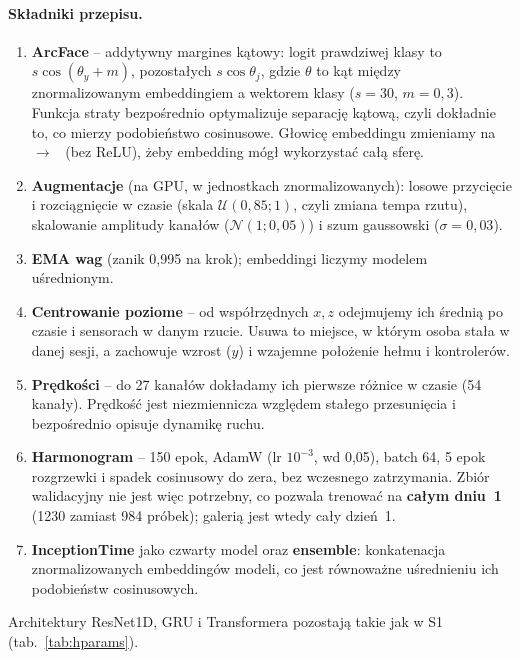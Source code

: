 \paragraph{Składniki przepisu.}
\begin{enumerate}
  \item \textbf{ArcFace} \cite{arcface} -- addytywny margines kątowy: logit prawdziwej klasy to
        $s\cos(\theta_y + m)$, pozostałych $s\cos\theta_j$, gdzie $\theta$ to kąt między
        znormalizowanym embeddingiem a wektorem klasy ($s = 30$, $m = 0{,}3$). Funkcja straty
        bezpośrednio optymalizuje separację kątową, czyli dokładnie to, co mierzy podobieństwo
        cosinusowe. Głowicę embeddingu zmieniamy na ~$\to$~ (bez ReLU),
        żeby embedding mógł wykorzystać całą sferę.
  \item \textbf{Augmentacje} (na GPU, w jednostkach znormalizowanych): losowe przycięcie i
        rozciągnięcie w czasie (skala $\mathcal{U}(0{,}85; 1)$, czyli zmiana tempa rzutu),
        skalowanie amplitudy kanałów ($\mathcal{N}(1; 0{,}05)$) i szum gaussowski ($\sigma = 0{,}03$).
  \item \textbf{EMA wag} \cite{ema} (zanik 0{,}995 na krok); embeddingi liczymy modelem uśrednionym.
  \item \textbf{Centrowanie poziome} -- od współrzędnych $x, z$ odejmujemy ich średnią po czasie i
        sensorach w danym rzucie. Usuwa to miejsce, w którym osoba stała w danej sesji, a zachowuje
        wzrost ($y$) i wzajemne położenie hełmu i kontrolerów.
  \item \textbf{Prędkości} -- do 27 kanałów dokładamy ich pierwsze różnice w czasie (54 kanały).
        Prędkość jest niezmiennicza względem stałego przesunięcia i bezpośrednio opisuje dynamikę
        ruchu.
  \item \textbf{Harmonogram} -- 150 epok, AdamW (lr $10^{-3}$, wd 0{,}05), batch 64, 5 epok rozgrzewki
        i spadek cosinusowy do zera, bez wczesnego zatrzymania. Zbiór walidacyjny nie jest więc
        potrzebny, co pozwala trenować na \textbf{całym dniu~1} (1230 zamiast 984 próbek); galerią
        jest wtedy cały dzień~1.
  \item \textbf{InceptionTime} jako czwarty model oraz \textbf{ensemble}: konkatenacja
        znormalizowanych embeddingów modeli, co jest równoważne uśrednieniu ich podobieństw
        cosinusowych.
\end{enumerate}
Architektury ResNet1D, GRU i Transformera pozostają takie jak w S1 (tab.~\ref{tab:hparams}).

